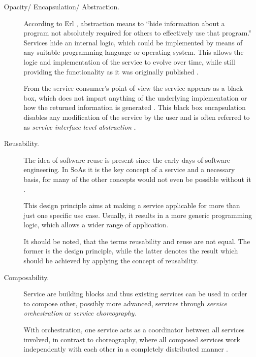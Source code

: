 \begin{description}
\item [Opacity/ Encapsulation/ Abstraction.]
According to Erl \cite[ch.8.1.]{erl2008}, abstraction means to ``hide information about a program not absolutely required for others to effectively use that program.'' 
Services hide an internal logic, which could be implemented by means of any suitable programming language or operating system. This allows the logic and implementation of the service to evolve over time, while still providing the functionality as it was originally published \cite[ch.8.1]{erl2008}.

From the service consumer's point of view the service appears as a black box, which does not impart anything of the underlying implementation or how the returned information is generated \cite{opengroup} \cite{breivold} \cite{arrowhead} \cite[p.27]{erl2011}. This black box encapsulation disables any modification of the service by the user and is often referred to as \emph{service interface level abstraction} \cite{breivold}.

\item [Reusability.]
The idea of software reuse is present since the early days of software engineering. In SoAs it is the key concept of a service and a necessary basis, for many of the other concepts would not even be possible without it \cite[ch.9.1.]{erl2008} \cite[p.27]{erl2011}.

This design principle aims at making a service applicable for more than just one specific use case. Usually, it results in a more generic programming logic, which allows a wider range of application.

It should be noted, that the terms reusability and reuse are not equal. The former is the design principle, while the latter denotes the result which should be achieved by applying the concept of reusability.

\item [Composability.] 
Service are building blocks and thus existing services can be used in order to compose other, possibly more advanced, services through \emph{service orchestration} or \emph{service choreography}. 

With orchestration, one service acts as a coordinator between all services involved, in contrast to choreography, where all composed services work independently with each other in a completely distributed manner \cite{opengroup} \cite{arrowhead} \cite{breivold} \cite[p.27]{erl2011}.


\end{description}
